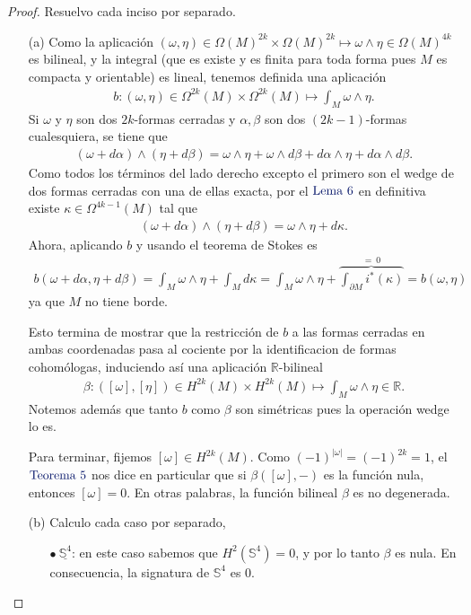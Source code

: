 \documentclass[11pt]{article}
\newcommand{\R}{\mathbb{R}}
\newcommand{\Ss}{\mathbb{S}}
\newcommand{\paint}[1]{\color{color}{#1}}
\newcommand{\tpaing}[1]{\paint{\text{#1}}}
\begin{document}
\begin{proof} Resuelvo cada inciso por separado.
\begin{itemize}[listparindent = \parindent]
\item[(a)] Como la aplicación $(\omega,\eta) \in \Omega(M)^{2k} \times \Omega(M)^{2k} \mapsto \omega \wedge \eta \in \Omega(M)^{4k}$ es bilineal, y la integral (que es existe y es finita para toda forma pues $M$ es compacta y orientable) es lineal, tenemos definida una aplicación
\begin{align*}
b : (\omega,\eta) \in \Omega^{2k}(M) \times \Omega^{2k}(M) \mapsto \int_M \omega \wedge \eta.
\end{align*}
Si $\omega$ y $\eta$ son dos $2k$-formas cerradas y $\alpha, \beta$ son dos $(2k-1)$-formas cualesquiera, se tiene que
\begin{align*}
(\omega+d\alpha) \wedge (\eta + d\beta) = \omega \wedge \eta + \omega \wedge d\beta + d\alpha \wedge \eta + d\alpha \wedge d\beta.
\end{align*}
Como todos los términos del lado derecho excepto el primero son el wedge de dos formas cerradas con una de ellas exacta, por el $\tpaing{Lema $6$}$ en definitiva existe $\kappa \in \Omega^{4k-1}(M)$ tal que 
\begin{align*}
(\omega+d\alpha) \wedge (\eta + d\beta) = \omega \wedge \eta + d\kappa.
\end{align*}
Ahora, aplicando $b$ y usando el teorema de Stokes es
\begin{align*}
b(\omega+d\alpha,\eta+d\beta) = \int_M \omega \wedge \eta + \int_M d\kappa = \int_M \omega \wedge \eta + \overbrace{\int_{\partial M}i^*(\kappa)}^{= \ 0} = b(\omega,\eta)
\end{align*}
ya que $M$ no tiene borde.

Esto termina de mostrar que la restricción de $b$ a las formas cerradas en ambas coordenadas pasa al cociente por la identificacion de formas cohomólogas, induciendo así una aplicación $\R$-bilineal
\begin{align*}
\beta : ([\omega],[\eta]) \in H^{2k}(M) \times H^{2k}(M) \mapsto \int_M \omega \wedge \eta \in \R.
\end{align*}
Notemos además que tanto $b$ como $\beta$ son simétricas pues la operación wedge lo es. 

Para terminar, fijemos $[\omega] \in H^{2k}(M)$. Como $(-1)^{|\omega|} = (-1)^{2k} = 1$, el $\tpaing{Teorema $5$}$ nos dice en particular que si $\beta([\omega],-)$ es la función nula, entonces $[\omega] = 0$. En otras palabras, la función bilineal $\beta$ es no degenerada. 

\item[(b)] Calculo cada caso por separado,
\begin{itemize}
\item[$\bullet \ \underline{\Ss^4}$:] en este caso sabemos que $H^2(\Ss^4) = 0$, y por lo tanto $\beta$ es nula. En consecuencia, la signatura de $\Ss^4$ es $0$.
\end{itemize}
\end{itemize}
\end{proof}
\end{document}
